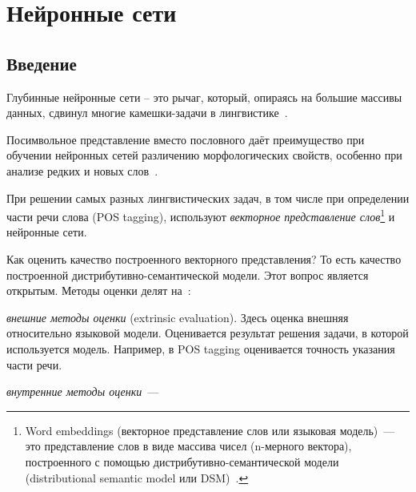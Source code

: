 \section{Нейронные сети} \label{sect_nn}

\subsection{Введение} \label{sect_nn_review}

Глубинные нейронные сети -- это рычаг, который, опираясь на большие массивы данных, сдвинул многие камешки-задачи в лингвистике~\cite[2827]{Cruz-Anastasopoulos-Stump2020Chatino}.

Посимвольное представление вместо пословного 
даёт преимущество при обучении нейронных сетей 
различению морфологических свойств, 
особенно при анализе редких и новых слов~\cite[868]{Belinkov2017NeuralLearnMorphology}.

При решении самых разных лингвистических задач, 
в том числе при определении части речи слова (POS tagging), 
используют \emph{векторное представление слов}\footnote{%
    Word embeddings (векторное представление слов или языковая модель)~--- 
    это представление слов в виде массива чисел (n-мерного вектора), 
    построенного с помощью 
    дистрибутивно-семантической модели 
    (distributional semantic model или DSM)~\cite[1]{SurveyDSM2018Bakarov}.
} 
и нейронные сети.


Как оценить качество построенного векторного представления? 
То есть качество построенной дистрибутивно-семантической модели. 
Этот вопрос является открытым. Методы оценки делят на~\cite{SurveyDSM2018Bakarov}:

 \emph{внешние методы оценки} (extrinsic evaluation).
 Здесь оценка внешняя относительно языковой модели. 
 Оценивается результат решения задачи, в которой используется модель. 
 Например, в POS tagging оценивается точность указания части речи.


 \emph{внутренние методы оценки}~--- 

